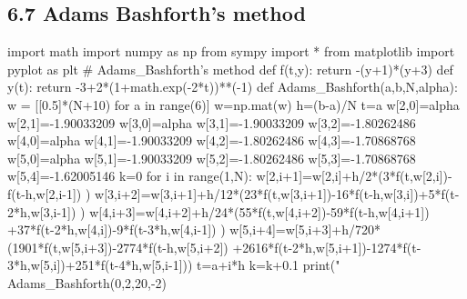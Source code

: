 \documentclass{article}
\begin{document}
\subsection{6.7 Adams Bashforth's method}
\begin{python}
import math
import numpy as np
from sympy import *
from matplotlib import pyplot as plt
# Adams_Bashforth's method
def f(t,y):
    return -(y+1)*(y+3)
def y(t):
    return -3+2*(1+math.exp(-2*t))**(-1)
def Adams_Bashforth(a,b,N,alpha):
    w = [[0.5]*(N+10) for a in range(6)]
    w=np.mat(w)
    h=(b-a)/N
    t=a
    w[2,0]=alpha
    w[2,1]=-1.90033209
    w[3,0]=alpha
    w[3,1]=-1.90033209
    w[3,2]=-1.80262486
    w[4,0]=alpha
    w[4,1]=-1.90033209
    w[4,2]=-1.80262486
    w[4,3]=-1.70868768 
    w[5,0]=alpha
    w[5,1]=-1.90033209
    w[5,2]=-1.80262486
    w[5,3]=-1.70868768 
    w[5,4]=-1.62005146
    k=0
    for i in range(1,N):
        w[2,i+1]=w[2,i]+h/2*(3*f(t,w[2,i])-f(t-h,w[2,i-1]) )
        w[3,i+2]=w[3,i+1]+h/12*(23*f(t,w[3,i+1])-16*f(t-h,w[3,i])+5*f(t-2*h,w[3,i-1]) )
        w[4,i+3]=w[4,i+2]+h/24*(55*f(t,w[4,i+2])-59*f(t-h,w[4,i+1])
        +37*f(t-2*h,w[4,i])-9*f(t-3*h,w[4,i-1]) )
        w[5,i+4]=w[5,i+3]+h/720*(1901*f(t,w[5,i+3])-2774*f(t-h,w[5,i+2])
        +2616*f(t-2*h,w[5,i+1])-1274*f(t-3*h,w[5,i])+251*f(t-4*h,w[5,i-1]))
        t=a+i*h
        k=k+0.1
        print("%
Adams_Bashforth(0,2,20,-2)
\end{python}
\end{document}
